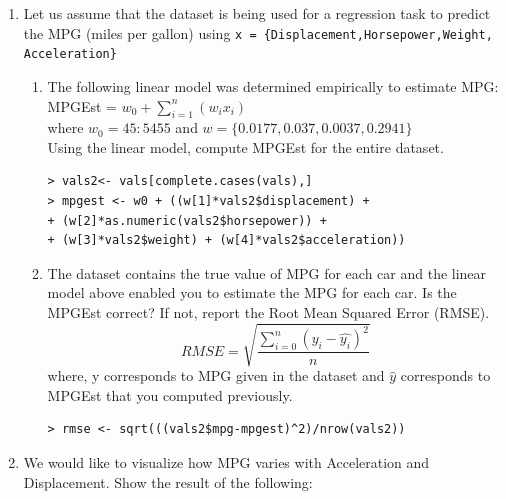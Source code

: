 \documentclass[fontsize=10pt]{scrartcl}
\begin{document}
\begin{enumerate}
		
		\item
		Let us assume that the dataset is being used for a regression task to predict the MPG (miles per gallon) using \texttt{x = \{Displacement,Horsepower,Weight, Acceleration\}} \\
		\begin{enumerate}
			\item
			The following linear model was determined empirically to estimate MPG: \\
			MPGEst = $w_0 + \sum_{i=1}^{n}(w_{i}x_{i})$ \\
			where $w_{0} = 45:5455$ and $w = \{0.0177,0.037,0.0037,0.2941\}$ \\
			Using the linear model, compute MPGEst for the entire dataset. \\
\begin{verbatim}
> vals2<- vals[complete.cases(vals),]
> mpgest <- w0 + ((w[1]*vals2$displacement) + 
+ (w[2]*as.numeric(vals2$horsepower)) + 
+ (w[3]*vals2$weight) + (w[4]*vals2$acceleration))
\end{verbatim}
			
			\item
			The dataset contains the true value of MPG for each car and the linear model above enabled you to estimate the MPG for each car. Is the MPGEst correct? If not, report the Root Mean Squared Error (RMSE). \\
			\begin{equation}
				RMSE = \sqrt{\frac{\sum_{i=0}^{n}(y_{i} - \hat{y_{i}})^2}{n}}
			\end{equation}
			where, y corresponds to MPG given in the dataset and $\hat{y}$ corresponds to MPGEst that you computed previously. \\
\begin{verbatim}
> rmse <- sqrt(((vals2$mpg-mpgest)^2)/nrow(vals2))
\end{verbatim}
		\end{enumerate}

		\item
		We would like to visualize how MPG varies with Acceleration and Displacement. Show the result of the following: \\


\end{enumerate}
\end{document}
